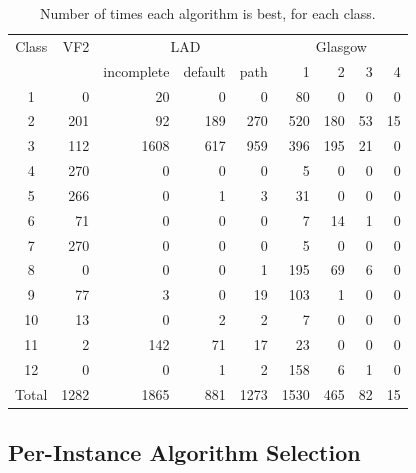 \documentclass{llncs}
\begin{document}
\begin{table}[t]
\begin{center}
\begin{tabular}{|c||r||r|r|r||r|r|r|r|}
\hline
Class & VF2 & \multicolumn{3}{c||}{LAD} & \multicolumn{4}{c|}{Glasgow}\\
&&incomplete&default&path&1&2&3&4\\\hline\hline
1 &        0 &       20 &        0 &        0 &       80 &        0 &        0 &        0 \\\hline
2 &      201 &       92 &      189 &      270 &      520 &      180 &       53 &       15 \\\hline
3 &      112 &     1608 &      617 &      959 &      396 &      195 &       21 &        0 \\\hline
4 &      270 &        0 &        0 &        0 &        5 &        0 &        0 &        0 \\\hline
5 &      266 &        0 &        1 &        3 &       31 &        0 &        0 &        0 \\\hline
6 &       71 &        0 &        0 &        0 &        7 &       14 &        1 &        0 \\\hline
7 &      270 &        0 &        0 &        0 &        5 &        0 &        0 &        0 \\\hline
8 &        0 &        0 &        0 &        1 &      195 &       69 &        6 &        0 \\\hline
9 &       77 &        3 &        0 &       19 &      103 &        1 &        0 &        0 \\\hline
10 &       13 &        0 &        2 &        2 &        7 &        0 &        0 &        0 \\\hline
11 &        2 &      142 &       71 &       17 &       23 &        0 &        0 &        0 \\\hline
12 &        0 &        0 &        1 &        2 &      158 &        6 &        1 &        0 \\\hline\hline
Total & 1282 & 1865 & 881 & 1273 & 1530 & 465 & 82& 15\\\hline
\end{tabular}
\end{center}
\caption{Number of times each algorithm is best, for each class.\label{expClass}}
\end{table}

\subsection{Per-Instance Algorithm Selection}
\end{document}
